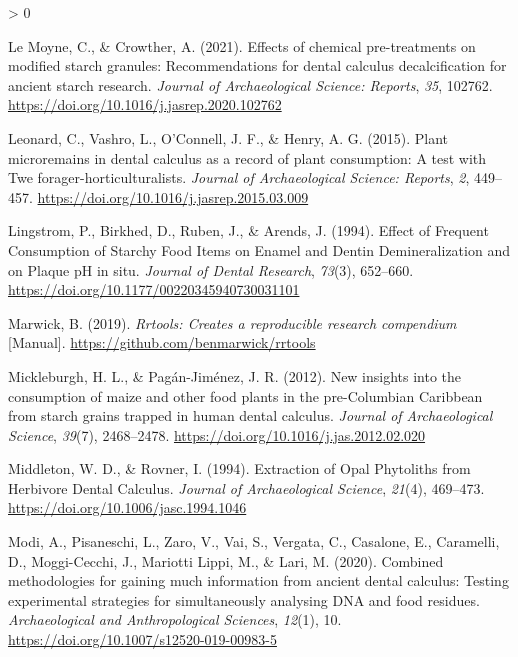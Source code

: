 \documentclass[
]{article}
\newlength{\cslhangindent}
\newenvironment{CSLReferences}[2] %
 {%
  \setlength{\parindent}{0pt}
  \ifodd #1 \everypar{\setlength{\hangindent}{\cslhangindent}}\ignorespaces\fi
  \ifnum #2 > 0
  \setlength{\parskip}{#2\baselineskip}
  \fi
 }%
 {}
\begin{document}
\begin{CSLReferences}{1}{0}
\leavevmode\hypertarget{ref-lemoyneCalculusPretreatments2021}{}%
Le Moyne, C., \& Crowther, A. (2021). Effects of chemical pre-treatments on modified starch granules: Recommendations for dental calculus decalcification for ancient starch research. \emph{Journal of Archaeological Science: Reports}, \emph{35}, 102762. \url{https://doi.org/10.1016/j.jasrep.2020.102762}

\leavevmode\hypertarget{ref-leonardDentalCalculus2015}{}%
Leonard, C., Vashro, L., O'Connell, J. F., \& Henry, A. G. (2015). Plant microremains in dental calculus as a record of plant consumption: A test with {Twe} forager-horticulturalists. \emph{Journal of Archaeological Science: Reports}, \emph{2}, 449--457. \url{https://doi.org/10.1016/j.jasrep.2015.03.009}

\leavevmode\hypertarget{ref-lingstromStarchyFood1994}{}%
Lingstrom, P., Birkhed, D., Ruben, J., \& Arends, J. (1994). Effect of {Frequent Consumption} of {Starchy Food Items} on {Enamel} and {Dentin Demineralization} and on {Plaque pH} in situ. \emph{Journal of Dental Research}, \emph{73}(3), 652--660. \url{https://doi.org/10.1177/00220345940730031101}

\leavevmode\hypertarget{ref-R-rrtools}{}%
Marwick, B. (2019). \emph{Rrtools: Creates a reproducible research compendium} {[}Manual{]}. \url{https://github.com/benmarwick/rrtools}

\leavevmode\hypertarget{ref-mickleburghNewInsightsConsumption2012}{}%
Mickleburgh, H. L., \& Pagán-Jiménez, J. R. (2012). New insights into the consumption of maize and other food plants in the pre-{Columbian Caribbean} from starch grains trapped in human dental calculus. \emph{Journal of Archaeological Science}, \emph{39}(7), 2468--2478. \url{https://doi.org/10.1016/j.jas.2012.02.020}

\leavevmode\hypertarget{ref-middletonExtractionOpalPhytoliths1994}{}%
Middleton, W. D., \& Rovner, I. (1994). Extraction of {Opal Phytoliths} from {Herbivore Dental Calculus}. \emph{Journal of Archaeological Science}, \emph{21}(4), 469--473. \url{https://doi.org/10.1006/jasc.1994.1046}

\leavevmode\hypertarget{ref-modiCalculusMethodologies2020}{}%
Modi, A., Pisaneschi, L., Zaro, V., Vai, S., Vergata, C., Casalone, E., Caramelli, D., Moggi-Cecchi, J., Mariotti Lippi, M., \& Lari, M. (2020). Combined methodologies for gaining much information from ancient dental calculus: Testing experimental strategies for simultaneously analysing {DNA} and food residues. \emph{Archaeological and Anthropological Sciences}, \emph{12}(1), 10. \url{https://doi.org/10.1007/s12520-019-00983-5}


\end{CSLReferences}
\end{document}

